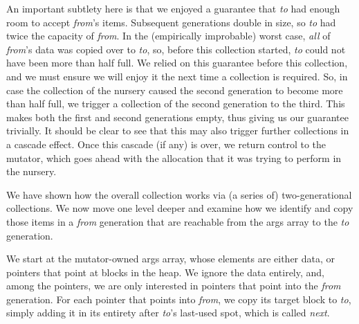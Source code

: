 An important subtlety here is that we enjoyed a 
guarantee that \emph{to} had enough room to accept 
\emph{from}'s items. Subsequent generations double in size, so 
\emph{to} had twice the capacity of \emph{from}.
In the (empirically improbable) worst case, 
\emph{all} of \emph{from}'s data was copied over to \emph{to}, 
so, before this collection started, \emph{to} could not have been more than 
half full. We relied on this guarantee before this collection, 
and we must ensure we will enjoy it the next time a collection 
is required. So, in case the collection of the nursery caused
the second generation to become more than half full, we trigger
a collection of the second generation to the third. This makes 
both the first and second generations empty, thus giving us our 
guarantee trivially. It should be 
clear to see that this may also trigger further collections in 
a cascade effect. Once this cascade (if any) is over, we
return control to the mutator, which goes ahead with 
the allocation that it was trying to perform in the nursery.

We have shown how the overall collection 
works via (a series of) two-generational collections. We now move one 
level deeper and examine how we identify and 
copy those items in a \emph{from} generation that are reachable
from the args array to the \emph{to} generation.

We start at the mutator-owned args array, whose elements
are either data, or pointers that point at blocks in the 
heap. We ignore the data entirely, and, among the pointers, we 
are only interested in pointers that point into the \emph{from} generation. 
For each pointer that points into \emph{from}, we copy its
target block to \emph{to}, simply adding it in its entirety 
after \emph{to}'s last-used spot, which is called \emph{next}. 


